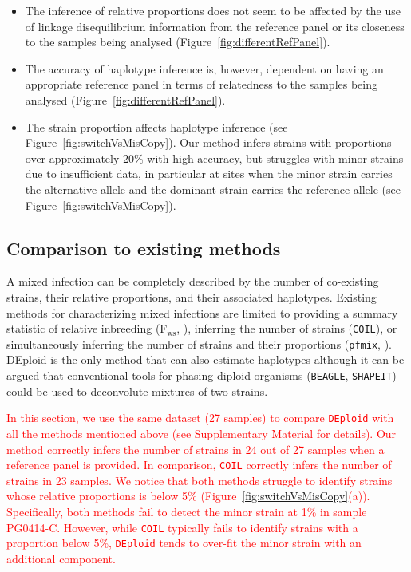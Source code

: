 \documentclass{bioinfo}
\newcounter{todocounter}
\newcommand{\done}[2][]
{\todo[color=green!40, #1]{#2}}
\newcommand{\donenum}[2][]
{\stepcounter{todocounter}\done[#1]{\thetodocounter: #2}}
\begin{document}
\begin{itemize}

\item The inference of relative proportions does not seem to be affected by the use of linkage disequilibrium information from the reference panel or its closeness to the samples being analysed (Figure~\ref{fig:differentRefPanel}).

\item The accuracy of haplotype inference is, however, dependent on having an appropriate reference panel in terms of relatedness to the samples being analysed (Figure~\ref{fig:differentRefPanel}).

\item The strain proportion affects haplotype inference (see Figure~\ref{fig:switchVsMisCopy}). Our method infers strains with proportions over approximately 20\% with high accuracy, but struggles with minor strains due to insufficient data, in particular at sites when the minor strain carries the alternative allele and the dominant strain carries the reference allele (see Figure~\ref{fig:switchVsMisCopy}).

\end{itemize}


\subsection{Comparison to existing methods}
A mixed infection can be completely described by the number of co-existing strains, their relative proportions, and their associated haplotypes. Existing methods for characterizing mixed infections are limited to providing a summary statistic of relative inbreeding (F$_{\textrm{ws}}$, \cite{Manske2012}), inferring the number of strains (\texttt{COIL}), or simultaneously inferring the number of strains and their proportions (\texttt{pfmix}, \cite{Jack2016} \donenum{REV1.20: O'Brien (2016)}). DEploid is the only method that can also estimate haplotypes although it can be argued that conventional tools for phasing diploid organisms (\texttt{BEAGLE}, \texttt{SHAPEIT}) could be used to deconvolute mixtures of two strains.

\textcolor{red}{In this section, we use the same dataset (27 samples) to compare \texttt{DEploid} with all the methods mentioned above (see Supplementary Material for details). Our method correctly infers the number of strains in 24 out of 27 samples when a reference panel is provided. In comparison, \texttt{COIL} correctly infers the number of strains in 23 samples. We notice that both methods struggle to identify strains whose relative proportions is below 5\% (Figure~\ref{fig:switchVsMisCopy}(a)). Specifically, both methods fail to detect the minor strain at 1\% in sample PG0414-C. However, while \texttt{COIL} typically fails to identify strains with a proportion below 5\%,  \texttt{DEploid} tends to over-fit the minor strain with an additional component.}
\end{document}

